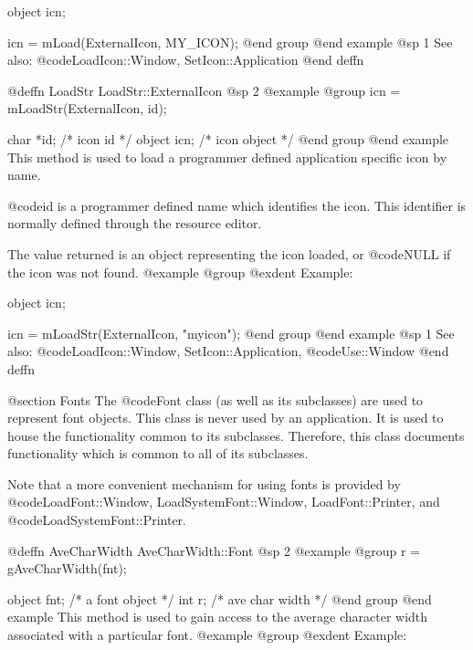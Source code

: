object  icn;

icn = mLoad(ExternalIcon, MY_ICON);
@end group
@end example
@sp 1
See also:  @code{LoadIcon::Window, SetIcon::Application}
@end deffn











@deffn {LoadStr} LoadStr::ExternalIcon
@sp 2
@example
@group
icn = mLoadStr(ExternalIcon, id);

char    *id;    /*  icon id      */
object   icn;   /*  icon object  */
@end group
@end example
This method is used to load a programmer defined application specific
icon by name.

@code{id} is a programmer defined name which identifies the icon.
This identifier is normally defined through the resource editor.

The value returned is an object representing the icon loaded, or
@code{NULL} if the icon was not found.
@example
@group
@exdent Example:

object  icn;

icn = mLoadStr(ExternalIcon, "myicon");
@end group
@end example
@sp 1
See also:  @code{LoadIcon::Window, SetIcon::Application,}
        @code{Use::Window}
@end deffn





@section Fonts
The @code{Font} class (as well as its subclasses) are used to represent
font objects.  This class is never used by an application.  It is used
to house the functionality common to its subclasses.  Therefore, this
class documents functionality which is common to all of its subclasses.

Note that a more convenient mechanism for using fonts is provided by
@code{LoadFont::Window, LoadSystemFont::Window, LoadFont::Printer},
and @code{LoadSystemFont::Printer}.










@deffn {AveCharWidth} AveCharWidth::Font
@sp 2
@example
@group
r = gAveCharWidth(fnt);

object   fnt;  /*  a font object  */
int      r;    /*  ave char width */
@end group
@end example
This method is used to gain access to the average character width
associated with a particular font.  
@example
@group
@exdent Example:

